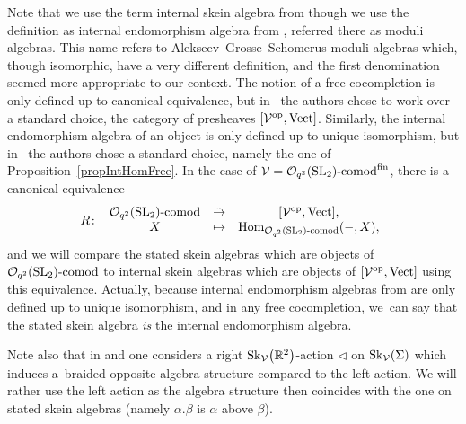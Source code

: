 \documentclass[pdftex]{sigma}%
\numberwithin{equation}{section}
\newcommand{\Hom}{\operatorname{Hom}}
\newcommand{\Oqcomfin}{\Oq\text{-}{\rm comod}^{\rm fin}}
\newcommand{\Oqcom}{\Oq\text{-}{\rm comod}}
\newcommand{\Oq}{\mathcal{O}_{q^2}({\rm SL}_2)}
\begin{document}
Note that we use the term internal skein algebra from \cite{Gunningham} though we use the definition as internal endomorphism algebra from \cite{BBJ}, referred there as moduli algebras. This name refers to Alekseev--Grosse--Schomerus moduli algebras which, though isomorphic, have a very different definition, and the first denomination seemed more appropriate to our context. The notion of a free cocompletion is only defined up to canonical equivalence, but in~\cite{Gunningham} the authors chose to work over a standard choice, the category of presheaves $[\mathcal{V}^{\rm op},{\rm Vect}]$. Similarly, the internal endomorphism algebra of an object is only defined up to unique isomorphism, but in~\cite{Gunningham} the authors chose a standard choice, namely the one of Proposition~\ref{propIntHomFree}. In the case of $\mathcal{V} = \Oqcomfin$, there is a canonical equivalence
\[
R\colon\  \begin{array}{ccc}
 \Oqcom &\tilde{\to}& [\mathcal{V}^{\rm op},{\rm Vect}],
 \\
 X &\mapsto& \Hom_{\Oqcom}(-,X),
\end{array}
\]
and we will compare the stated skein algebras which are objects of $\Oqcom$ to internal skein algebras which are objects of $[\mathcal{V}^{\rm op},{\rm Vect}]$ using this equivalence. Actually, because internal endomorphism algebras from \cite{BBJ} are only defined up to unique isomorphism, and in any free cocompletion, we~can say that the stated skein algebra \emph{is} the internal endomorphism algebra.

Note also that in \cite{Gunningham} and \cite{BBJ} one considers a right ${\rm Sk}_\mathcal{V}\big(\mathbb{R}^2\big)$-action $\lhd$ on ${\rm Sk}_\mathcal{V}(\Sigma)$ which induces a~braided opposite algebra structure compared to the left action. We will rather use the left action as the algebra structure then coincides with the one on stated skein algebras (namely $\alpha . \beta$ is $\alpha$ above $\beta$).
\end{document}

